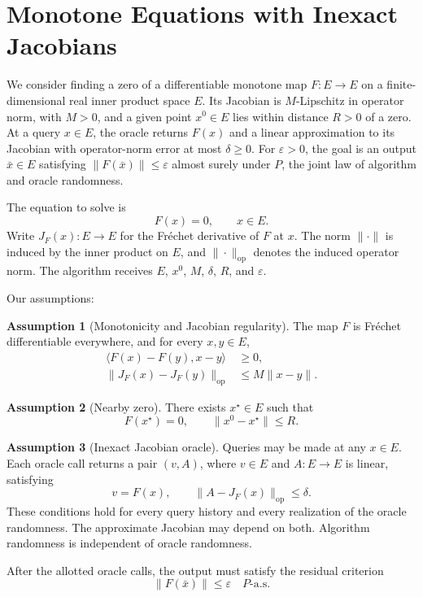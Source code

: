 \documentclass[10pt]{article}
\theoremstyle{definition}
\newtheorem{assumption}{Assumption}
\begin{document}
\section*{Monotone Equations with Inexact Jacobians}
We consider finding a zero of a differentiable monotone map $F:E\to E$ on a finite-dimensional real inner product space $E$. Its Jacobian is $M$-Lipschitz in operator norm, with $M>0$, and a given point $x^0\in E$ lies within distance $R>0$ of a zero. At a query $x\in E$, the oracle returns $F(x)$ and a linear approximation to its Jacobian with operator-norm error at most $\delta\geq0$. For $\varepsilon>0$, the goal is an output $\bar{x}\in E$ satisfying $\|F(\bar{x})\|\leq\varepsilon$ almost surely under $P$, the joint law of algorithm and oracle randomness.

The equation to solve is
\[
F(x)=0,\qquad x\in E.
\]
Write $J_F(x):E\to E$ for the Fr\'echet derivative of $F$ at $x$. The norm $\|\cdot\|$ is induced by the inner product on $E$, and $\|\cdot\|_{\mathrm{op}}$ denotes the induced operator norm. The algorithm receives $E$, $x^0$, $M$, $\delta$, $R$, and $\varepsilon$.

Our assumptions:
\begin{assumption}[Monotonicity and Jacobian regularity]
The map $F$ is Fr\'echet differentiable everywhere, and for every $x,y\in E$,
\[
\begin{aligned}
\langle F(x)-F(y),x-y\rangle&\geq0,\\
\|J_F(x)-J_F(y)\|_{\mathrm{op}}&\leq M\|x-y\|.
\end{aligned}
\]
\end{assumption}

\begin{assumption}[Nearby zero]
There exists $x^\star\in E$ such that
\[
F(x^\star)=0,\qquad \|x^0-x^\star\|\leq R.
\]
\end{assumption}

\begin{assumption}[Inexact Jacobian oracle]
Queries may be made at any $x\in E$. Each oracle call returns a pair $(v,A)$, where $v\in E$ and $A:E\to E$ is linear, satisfying
\[
v=F(x),\qquad \|A-J_F(x)\|_{\mathrm{op}}\leq\delta.
\]
These conditions hold for every query history and every realization of the oracle randomness. The approximate Jacobian may depend on both. Algorithm randomness is independent of oracle randomness.
\end{assumption}

After the allotted oracle calls, the output must satisfy the residual criterion
\[
\|F(\bar{x})\|\leq\varepsilon
\quad P\text{-a.s.}
\]
\end{document}
